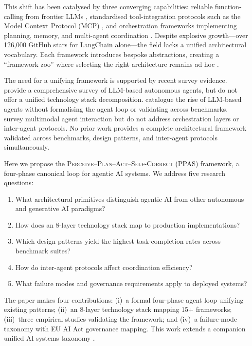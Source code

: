 \documentclass[review]{elsarticle}
\theoremstyle{definition}
\begin{document}
This shift has been catalysed by three converging capabilities: reliable function-calling from frontier LLMs \citep{openai2024gpt4o,anthropic2024claude}, standardised tool-integration protocols such as the Model Context Protocol (MCP) \citep{anthropic2024mcp}, and orchestration frameworks implementing planning, memory, and multi-agent coordination \citep{langchain2024langgraph,wu2023autogen}. Despite explosive growth---over 126,000 GitHub stars for LangChain alone---the field lacks a unified architectural vocabulary. Each framework introduces bespoke abstractions, creating a ``framework zoo'' where selecting the right architecture remains ad hoc \citep{masterman2024landscape}.

The need for a unifying framework is supported by recent survey evidence. \citet{wang2024survey} provide a comprehensive survey of LLM-based autonomous agents, but do not offer a unified technology stack decomposition. \citet{xi2023rise} catalogue the rise of LLM-based agents without formalising the agent loop or validating across benchmarks. \citet{durante2024agent} survey multimodal agent interaction but do not address orchestration layers or inter-agent protocols. No prior work provides a complete architectural framework validated across benchmarks, design patterns, and inter-agent protocols simultaneously.

Here we propose the \textsc{Perceive--Plan--Act--Self-Correct} (PPAS) framework, a four-phase canonical loop for agentic AI systems. We address five research questions:

\begin{enumerate}
    \item[\textbf{RQ1.}] What architectural primitives distinguish agentic AI from other autonomous and generative AI paradigms?
    \item[\textbf{RQ2.}] How does an 8-layer technology stack map to production implementations?
    \item[\textbf{RQ3.}] Which design patterns yield the highest task-completion rates across benchmark suites?
    \item[\textbf{RQ4.}] How do inter-agent protocols affect coordination efficiency?
    \item[\textbf{RQ5.}] What failure modes and governance requirements apply to deployed systems?
\end{enumerate}

The paper makes four contributions: (i)~a formal four-phase agent loop unifying existing patterns; (ii)~an 8-layer technology stack mapping 15+ frameworks; (iii)~three empirical studies validating the framework; and (iv)~a failure-mode taxonomy with EU AI Act governance mapping. This work extends a companion unified AI systems taxonomy \citep{anon2026taxonomy}.
\end{document}
